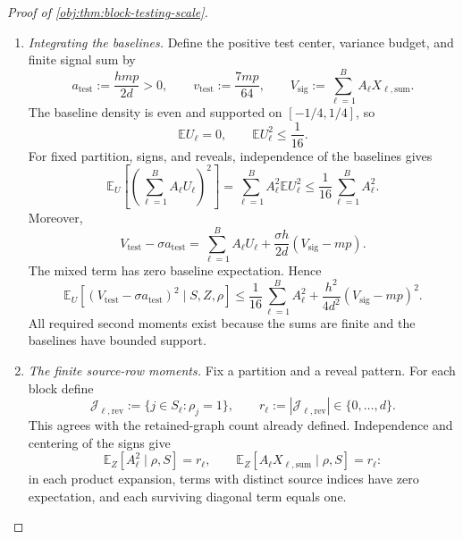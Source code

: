 \begin{proof}[Proof of \cref{obj:thm:block-testing-scale}]
\begin{enumerate}
For a fixed true partition, the reveal indicator of each source depends on its \(d\) outgoing audit marks. These edge sets are disjoint across sources, so the reveal indicators have independent Bernoulli\((p)\) laws. They are independent of treatment signs and baselines. The statistic consequently has the law obtained by drawing the genuine partition, independent treatment signs, independent reveal indicators, and independent baselines, and then forming
\[
A_\ell=\sum_{j\in S_\ell}\rho_jX_j,
\qquad
V_{\mathrm{test}}
=
\sum_{\ell=1}^{B}
A_\ell\left(
U_\ell+\frac{\sigma h}{2d}X_{\ell,\mathrm{sum}}
\right).
\]
Mixing this identity over the partition and baselines gives the scalar law in the preceding projection inequality.

\item \textit{Integrating the baselines.}
Define the positive test center, variance budget, and finite signal sum by
\[
a_{\mathrm{test}}:=\frac{hmp}{2d}>0,
\qquad
v_{\mathrm{test}}:=\frac{7mp}{64},
\qquad
V_{\mathrm{sig}}:=\sum_{\ell=1}^{B}A_\ell X_{\ell,\mathrm{sum}}.
\]
The baseline density is even and supported on \([-1/4,1/4]\), so
\[
\mathbb E U_\ell=0,
\qquad
\mathbb E U_\ell^2\le\frac1{16}.
\]
For fixed partition, signs, and reveals, independence of the baselines gives
\[
\mathbb E_U\!\left[\left(\sum_{\ell=1}^{B}A_\ell U_\ell\right)^2\right]
=
\sum_{\ell=1}^{B}A_\ell^2\mathbb E U_\ell^2
\le\frac1{16}\sum_{\ell=1}^{B}A_\ell^2.
\]
Moreover,
\[
V_{\mathrm{test}}-\sigma a_{\mathrm{test}}
=
\sum_{\ell=1}^{B}A_\ell U_\ell
+\frac{\sigma h}{2d}(V_{\mathrm{sig}}-mp).
\]
The mixed term has zero baseline expectation. Hence
\[
\mathbb E_U[
(V_{\mathrm{test}}-\sigma a_{\mathrm{test}})^2
\mid S,Z,\rho]
\le
\frac1{16}\sum_{\ell=1}^{B}A_\ell^2
+\frac{h^2}{4d^2}(V_{\mathrm{sig}}-mp)^2.
\]
All required second moments exist because the sums are finite and the baselines have bounded support.

\item \textit{The finite source-row moments.}
Fix a partition and a reveal pattern. For each block define
\[
\mathcal J_{\ell,\mathrm{rev}}
:=\{j\in S_\ell:\rho_j=1\},
\qquad
r_\ell:=|\mathcal J_{\ell,\mathrm{rev}}|\in\{0,\ldots,d\}.
\]
This agrees with the retained-graph count already defined. Independence and centering of the signs give
\[
\mathbb E_Z[A_\ell^2\mid\rho,S]=r_\ell,
\qquad
\mathbb E_Z[A_\ell X_{\ell,\mathrm{sum}}\mid\rho,S]=r_\ell:
\]
in each product expansion, terms with distinct source indices have zero expectation, and each surviving diagonal term equals one.


\end{enumerate}
\end{proof}
